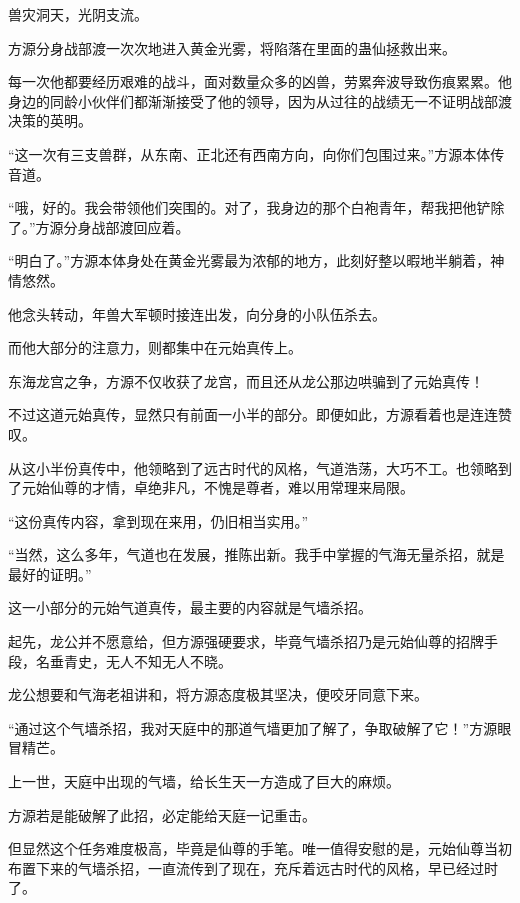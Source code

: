 
\begin{this_body}



兽灾洞天，光阴支流。

方源分身战部渡一次次地进入黄金光雾，将陷落在里面的蛊仙拯救出来。

每一次他都要经历艰难的战斗，面对数量众多的凶兽，劳累奔波导致伤痕累累。他身边的同龄小伙伴们都渐渐接受了他的领导，因为从过往的战绩无一不证明战部渡决策的英明。

“这一次有三支兽群，从东南、正北还有西南方向，向你们包围过来。”方源本体传音道。

“哦，好的。我会带领他们突围的。对了，我身边的那个白袍青年，帮我把他铲除了。”方源分身战部渡回应着。

“明白了。”方源本体身处在黄金光雾最为浓郁的地方，此刻好整以暇地半躺着，神情悠然。

他念头转动，年兽大军顿时接连出发，向分身的小队伍杀去。

而他大部分的注意力，则都集中在元始真传上。

东海龙宫之争，方源不仅收获了龙宫，而且还从龙公那边哄骗到了元始真传！

不过这道元始真传，显然只有前面一小半的部分。即便如此，方源看着也是连连赞叹。

从这小半份真传中，他领略到了远古时代的风格，气道浩荡，大巧不工。也领略到了元始仙尊的才情，卓绝非凡，不愧是尊者，难以用常理来局限。

“这份真传内容，拿到现在来用，仍旧相当实用。”

“当然，这么多年，气道也在发展，推陈出新。我手中掌握的气海无量杀招，就是最好的证明。”

这一小部分的元始气道真传，最主要的内容就是气墙杀招。

起先，龙公并不愿意给，但方源强硬要求，毕竟气墙杀招乃是元始仙尊的招牌手段，名垂青史，无人不知无人不晓。

龙公想要和气海老祖讲和，将方源态度极其坚决，便咬牙同意下来。

“通过这个气墙杀招，我对天庭中的那道气墙更加了解了，争取破解了它！”方源眼冒精芒。

上一世，天庭中出现的气墙，给长生天一方造成了巨大的麻烦。

方源若是能破解了此招，必定能给天庭一记重击。

但显然这个任务难度极高，毕竟是仙尊的手笔。唯一值得安慰的是，元始仙尊当初布置下来的气墙杀招，一直流传到了现在，充斥着远古时代的风格，早已经过时了。


\end{this_body}
